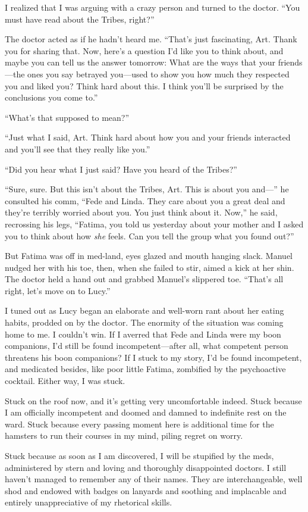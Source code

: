 I realized that I was arguing with a crazy person and turned to the
doctor. “You must have read about the Tribes, right?”

The doctor acted as if he hadn’t heard me. “That’s just
fascinating, Art. Thank you for sharing that. Now, here’s a
question I’d like you to think about, and maybe you can tell us the
answer tomorrow: What are the ways that your friends—the ones you
say betrayed you—used to show you how much they respected you and
liked you? Think hard about this. I think you’ll be surprised by
the conclusions you come to.”

“What’s that supposed to mean?”

“Just what I said, Art. Think hard about how you and your friends
interacted and you’ll see that they really like you.”

“Did you hear what I just said? Have you heard of the Tribes?”

“Sure, sure. But this isn’t about the Tribes, Art. This is about
you and—” he consulted his comm, “Fede and Linda. They care about
you a great deal and they’re terribly worried about you. You just
think about it. Now,” he said, recrossing his legs, “Fatima, you
told us yesterday about your mother and I asked you to think about
how \emph{she} feels. Can you tell the group what you found out?”

But Fatima was off in med-land, eyes glazed and mouth hanging
slack. Manuel nudged her with his toe, then, when she failed to
stir, aimed a kick at her shin. The doctor held a hand out and
grabbed Manuel’s slippered toe. “That’s all right, let’s move on to
Lucy.”

I tuned out as Lucy began an elaborate and well-worn rant about her
eating habits, prodded on by the doctor. The enormity of the
situation was coming home to me. I couldn’t win. If I averred that
Fede and Linda were my boon companions, I’d still be found
incompetent—after all, what competent person threatens his boon
companions? If I stuck to my story, I’d be found incompetent, and
medicated besides, like poor little Fatima, zombified by the
psychoactive cocktail. Either way, I was stuck.

Stuck on the roof now, and it’s getting very uncomfortable indeed.
Stuck because I am officially incompetent and doomed and damned to
indefinite rest on the ward. Stuck because every passing moment
here is additional time for the hamsters to run their courses in my
mind, piling regret on worry.

Stuck because as soon as I am discovered, I will be stupified by
the meds, administered by stern and loving and thoroughly
disappointed doctors. I still haven’t managed to remember any of
their names. They are interchangeable, well shod and endowed with
badges on lanyards and soothing and implacable and entirely
unappreciative of my rhetorical skills.

